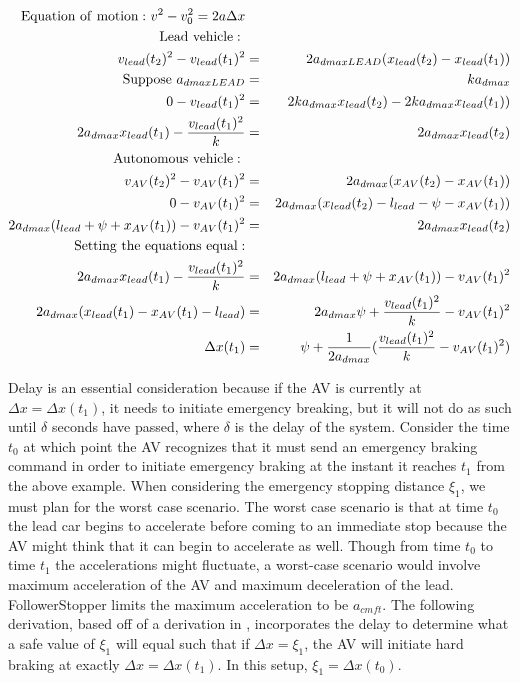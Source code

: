 \documentclass[conference]{IEEEtran}
\begin{document}
\begin{appendix}
\begin{eqnarray*}
{\rm Equation\ of\ motion:\ } v^2-v_0^2 = 2a\Delta x \\
{\rm Lead\ vehicle:\ } \\
v_{lead}(t_2)^2-v_{lead}(t_1)^2 &=& 2 a_{dmaxLEAD}(x_{lead}(t_2)-x_{lead}(t_1)) \\
{\rm Suppose\ } a_{dmaxLEAD} &=& ka_{dmax} \\
0-v_{lead}(t_1)^2 &=& 2ka_{dmax}x_{lead}(t_2)-2ka_{dmax}x_{lead}(t_1)) \\
2a_{dmax}x_{lead}(t_1) -{v_{lead}(t_1)^2\over k} &=& 2a_{dmax}x_{lead}(t_2) \\
{\rm Autonomous\ vehicle:\ } \\
v_{AV}(t_2)^2-v_{AV}(t_1)^2 &=& 2 a_{dmax}(x_{AV}(t_2)-x_{AV}(t_1)) \\
0-v_{AV}(t_1)^2 &=& 2a_{dmax}(x_{lead}(t_2)-l_{lead}-\psi-x_{AV}(t_1)) \\
2a_{dmax}(l_{lead}+\psi+x_{AV}(t_1))-v_{AV}(t_1)^2 &=& 2a_{dmax}x_{lead}(t_2)\\
{\rm Setting\ the\ equations\ equal:} \\
2a_{dmax}x_{lead}(t_1) -{v_{lead}(t_1)^2\over k} &=& 2a_{dmax}(l_{lead}+\psi+x_{AV}(t_1))-v_{AV}(t_1)^2 \\
2a_{dmax}(x_{lead}(t_1)-x_{AV}(t_1)-l_{lead}) &=& 2a_{dmax}\psi+{v_{lead}(t_1)^2\over k}-v_{AV}(t_1)^2\\
\Delta x(t_1) &=& \psi+{1\over 2a_{dmax}}({v_{lead}(t_1)^2\over k}-v_{AV}(t_1)^2) \\
\end{eqnarray*}

Delay is an essential consideration because if the AV is currently at $\Delta x=\Delta x(t_1)$, it needs to initiate emergency breaking, but it will not do as such until $\delta$ seconds have passed, where $\delta$ is the delay of the system. Consider the time $t_0$ at which point the AV recognizes that it must send an emergency braking command in order to initiate emergency braking at the instant it reaches $t_1$ from the above example. When considering the emergency stopping distance $\xi_1$, we must plan for the worst case scenario. The worst case scenario is that at time $t_0$ the lead car begins to accelerate before coming to an immediate stop because the AV might think that it can begin to accelerate as well. Though from time $t_0$ to time $t_1$ the accelerations might fluctuate, a worst-case scenario would involve maximum acceleration of the AV and maximum deceleration of the lead. FollowerStopper limits the maximum acceleration to be $a_{cmft}$. The following derivation, based off of a derivation in \cite{Real-time}, incorporates the delay to determine what a safe value of $\xi_1$ will equal such that if $\Delta x=\xi_1$, the AV will initiate hard braking at exactly $\Delta x = \Delta x(t_1)$. In this setup, $\xi_1=\Delta x(t_0)$.


\end{appendix}
\end{document}
